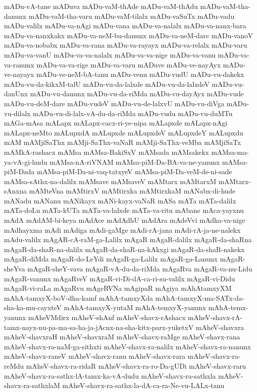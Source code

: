 {mADu-vA-tane
mADuva
mADu-vaM-thAde
mADu-vaM-thAdu
mADu-vaM-tha-danunx
mADu-vaM-tha-varu
mADu-vaM-tilalx
mADu-vaSuTx
mADu-vadu
mADu-valilx
mADu-va-nAgi
mADu-vana
mADu-va-nalalx
mADu-va-nanx-bara
mADu-va-nanxkakx
mADu-va-neM-bu-danunx
mADu-va-neM-dare
mADu-vanoV
mADu-va-nobabx
mADu-va-rana
mADu-va-rayayx
mADu-va-relalx
mADu-varu
mADu-va-vanU
mADu-va-va-nalalx
mADu-va-va-nige
mADu-va-vanu
mADu-va-va-ranunx
mADu-va-va-rige
mADu-va-varu
mADuve
mADu-ve-nayAyx
mADu-ve-nayayx
mADu-ve-neM-bA-tanu
mADu-venu
mADu-vudU
mADu-vu-dakekx
mADu-vu-da-kikxM-talU
mADu-vu-da-lalxde
mADu-vu-da-lalxdeV
mADu-vu-danUnx
mADu-vu-danunx
mADu-vu-da-riMda
mADu-vu-dayAyx
mADu-vude
mADu-vu-deM-dare
mADu-vudeV
mADu-vu-de-lalxvU
mADu-vu-diVga
mADu-vu-dilalx
mADu-vu-di-lalx-vA-du-da-riMda
mADu-vudu
mADu-vu-duMTu
mAGa-mAsa
mALapx
mALapx-cacx-ri-ye-nipa
mALapxde
mALapx-nAgi
mALapx-neMto
mALupxdA
mALupxde
mALupxdeV
mALupxdeY
mALupxdu
mAM
mAMjiSaThx
mAMji-SaThx-vaNaR
mAMji-SaThx-veMba
mAMjiSaTx
mAMkA-rashacx
mAMsa
mAMsa-BakiSxV
mAMsada
mAMsakekx
mAMsa-ma-ya-vA-gi-hudu
mAMsa-nA-riVNAM
mAMsa-piM-Da-BA-va-ne-yanunx
mAMsa-piM-Dada
mAMsa-piM-Da-ni-vaq-tatxyeV
mAMsa-piM-Da-veM-de-ni-sade
mAMsa-sAthx-na-dalilx
mAMsave
mAMsaveV
mAMtarx
mAMtarxM
mAMtarx-sAnxna
mAMteVna
mAMtirxV
mAMtirxka
mAMtirxkaM
mANabx-di-hude
mANadu
mANanu
mANikayx
mANi-kayx-vaNaR
mASa
mATa
mATa-dalilx
mATa-doLu
mATa-kUTa
mATa-va-lalxde
mATa-va-ritu
mAbane
mAca-yayxnu
mAdA
mAdAM-bi-keya
mAdAce
mAdAdhU
mAdAra
mAdeVvi
mAdha-va-nige
mAdhayxma
mAdi
mAdiga
mAdi-gaMge
mAdi-rA-jana
mAdi-rA-ja-ne-nalekx
mAdu-valilx
mAgAR-cA-raM-ga-Lalilx
mAgaR
mAgaR-dalilx
mAgaR-da-shaRna
mAgaR-da-shaR-na-dalilx
mAgaR-da-shaR-na-kAkxgi
mAgaR-da-shaR-nakekx
mAgaR-diMda
mAgaR-do-LeYdi
mAgaR-ga-Lalilx
mAgaR-ga-Lanunx
mAgaR-sheYva
mAgaR-sheY-vava
mAgaR-vA-du-da-riMda
mAgaRva
mAgaR-va-nu-Lidu
mAgaR-vanunx
mAgaRveV
mAgaR-vi-Di-dA-ca-ri-su-valilx
mAgaR-vi-Didu
mAgaR-vi-raLa
mAgaRvu
mAgeRVNa
mAgipaR
mAgiya
mAhAtamxyXM
mAhA-tamxyX-boV-dha-kamf
mAhA-tamxyXda
mAhA-tamxyX-ma-SATx-da-sha-ka-mu-cayxteV
mAhA-tamxyX-yutaM
mAhA-temxyX-yanunx
mAhA-temx-yanunx
mAheVMdirx
mAheV-shAnf
mAheV-shavx-rAshacx
mAheV-shavx-rA-tamx-nayx-nu-pa-ma-sa-ha-ja-jAcnx-na-sha-kitx-parx-yuketxV
mAheV-shavxra
mAheV-shavxraH
mAheV-shavxraM
mAheV-shavx-raMge
mAheV-shavx-rana
mAheV-shavx-ra-naM-ga-sithxti
mAheV-shavx-ra-nalilx
mAheV-shavx-ra-nanunx
mAheV-shavx-raneV
mAheV-shavx-ranu
mAheV-shavx-rara
mAheV-shavx-ra-reMdu
mAheV-shavx-ra-ridaR
mAheV-shavx-ra-ro-Da-gUDi
mAheV-shavx-raru
mAheV-shavx-ra-sathx-lA-tamx-ka-vA-dudu
mAheV-shavx-ra-sathxla
mAheV-shavx-ra-sathxlaM
mAheV-shavx-ra-sathx-la-dA-ca-ra-Ne-vu-LALx-tanu
}
